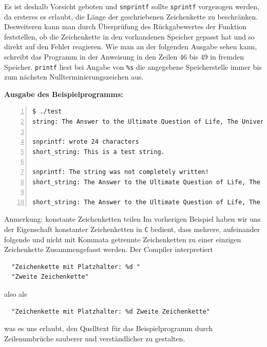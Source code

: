 Es ist deshalb Vorsicht geboten und \texttt{snprintf} sollte \texttt{sprintf} vorgezogen werden, da ersteres es erlaubt, die Länge der geschriebenen Zeichenkette zu beschränken.
Desweiteren kann man durch Überprüfung des Rückgabewertes der Funktion feststellen, ob die Zeichenkette in den vorhandenen Speicher gepasst hat und so direkt auf den Fehler reagieren.
Wie man an der folgenden Ausgabe sehen kann, schreibt das Programm in der Anweisung in den Zeilen $46$ bis $49$ in fremden Speicher.
\texttt{printf} liest bei Angabe von \texttt{\%s} die angegebene Speicherstelle immer bis zum nächsten Nullterminierungszeichen aus.

\noindent \textbf{Ausgabe des Beispielprogramms:}
{\footnotesize
\begin{lstlisting}[numbers=left]
$ ./test
string: The Answer to the Ultimate Question of Life, The Universe, and Everything is 42.

snprintf: wrote 24 characters
short_string: This is a test string.

snprintf: The string was not completely written!
short_string: The Answer to the Ultimate Question of Life, The

short_string: The Answer to the Ultimate Question of Life, The Universe, and Everything is 42.
\end{lstlisting}
}

\begin{myalertblock}{Anmerkung: konstante Zeichenketten teilen}
Im vorherigen Beispiel haben wir uns der Eigenschaft konstanter Zeichenketten in \texttt{C} bedient, dass mehrere, aufeinander folgende und nicht mit Kommata getrennte Zeichenketten zu einer einzigen Zeichenkette Zusammengefasst werden.
Der Compiler interpretiert
\begin{lstlisting}
  "Zeichenkette mit Platzhalter: %d "
  "Zweite Zeichenkette"
\end{lstlisting}
also als
\begin{lstlisting}
  "Zeichenkette mit Platzhalter: %d Zweite Zeichenkette"
\end{lstlisting}
was es uns erlaubt, den Quelltext für das Beispielprogramm durch Zeilenumbrüche sauberer und verständlicher zu gestalten.
\end{myalertblock}

\endinput
